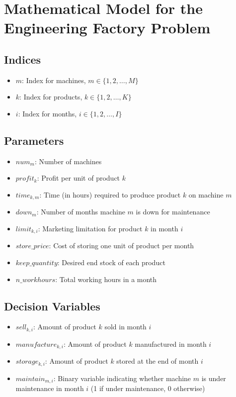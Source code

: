 \documentclass{article}
\begin{document}
\section*{Mathematical Model for the Engineering Factory Problem}

\subsection*{Indices}
\begin{itemize}
    \item $m$: Index for machines, $m \in \{1, 2, \ldots, M\}$
    \item $k$: Index for products, $k \in \{1, 2, \ldots, K\}$
    \item $i$: Index for months, $i \in \{1, 2, \ldots, I\}$
\end{itemize}

\subsection*{Parameters}
\begin{itemize}
    \item $num_m$: Number of machines
    \item $profit_k$: Profit per unit of product $k$
    \item $time_{k,m}$: Time (in hours) required to produce product $k$ on machine $m$
    \item $down_m$: Number of months machine $m$ is down for maintenance
    \item $limit_{k,i}$: Marketing limitation for product $k$ in month $i$
    \item $store\_price$: Cost of storing one unit of product per month
    \item $keep\_quantity$: Desired end stock of each product
    \item $n\_workhours$: Total working hours in a month
\end{itemize}

\subsection*{Decision Variables}
\begin{itemize}
    \item $sell_{k,i}$: Amount of product $k$ sold in month $i$
    \item $manufacture_{k,i}$: Amount of product $k$ manufactured in month $i$
    \item $storage_{k,i}$: Amount of product $k$ stored at the end of month $i$
    \item $maintain_{m,i}$: Binary variable indicating whether machine $m$ is under maintenance in month $i$ (1 if under maintenance, 0 otherwise)
\end{itemize}
\end{document}
